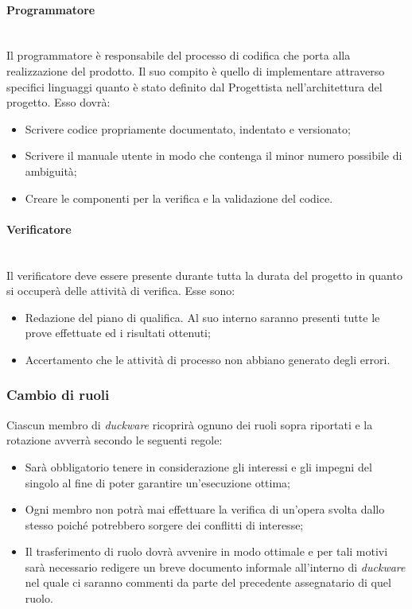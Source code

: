 \paragraph{Programmatore}\mbox{}\\[0.4cm]
Il programmatore è responsabile del processo di codifica che porta alla realizzazione del prodotto. Il suo compito è quello di implementare attraverso specifici linguaggi quanto è stato definito dal Progettista nell’architettura del progetto. Esso dovrà:
\begin{itemize}
    \item Scrivere codice propriamente documentato, indentato e versionato;
    \item Scrivere il manuale utente in modo che contenga il minor numero possibile di ambiguità;
    \item Creare le componenti per la verifica e la validazione del codice.
\end{itemize}

\paragraph{Verificatore}\mbox{}\\[0.4cm]
Il verificatore deve essere presente durante tutta la durata del progetto in quanto si occuperà delle attività di verifica. Esse sono:
\begin{itemize}
    \item Redazione del piano di qualifica. Al suo interno saranno presenti tutte le prove effettuate ed i risultati ottenuti;
    \item Accertamento  che le attività di processo non abbiano generato degli errori.
\end{itemize}

\subsubsection{Cambio di ruoli}
Ciascun membro di \emph{duckware} ricoprirà ognuno dei ruoli sopra riportati e la rotazione avverrà secondo le seguenti regole:
\begin{itemize}
    \item Sarà obbligatorio tenere in considerazione gli interessi e gli impegni del singolo al fine di poter garantire un’esecuzione ottima;
    \item Ogni membro non potrà mai effettuare la verifica di un’opera svolta dallo stesso poiché potrebbero sorgere dei conflitti di interesse;
    \item Il trasferimento di ruolo dovrà avvenire in modo ottimale e per tali motivi sarà necessario redigere un breve documento informale all’interno di \emph{duckware} nel quale ci saranno commenti da parte del precedente assegnatario di quel ruolo.
\end{itemize}

